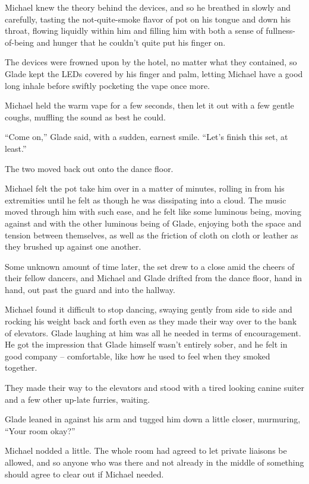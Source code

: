 \documentclass[12pt,letterpaper,oneside]{memoir}
\begin{document}
  Michael knew the theory behind the devices, and so he breathed in slowly and carefully, tasting the not-quite-smoke flavor of pot on his tongue and down his throat, flowing liquidly within him and filling him with both a sense of fullness-of-being and hunger that he couldn't quite put his finger on.

  The devices were frowned upon by the hotel, no matter what they contained, so Glade kept the LEDs covered by his finger and palm, letting Michael have a good long inhale before swiftly pocketing the vape once more.

  Michael held the warm vape for a few seconds, then let it out with a few gentle coughs, muffling the sound as best he could.

  ``Come on,'' Glade said, with a sudden, earnest smile.  ``Let's finish this set, at least.''

  The two moved back out onto the dance floor.

  Michael felt the pot take him over in a matter of minutes, rolling in from his extremities until he felt as though he was dissipating into a cloud.  The music moved through him with such ease, and he felt like some luminous being, moving against and with the other luminous being of Glade, enjoying both the space and tension between themselves, as well as the friction of cloth on cloth or leather as they brushed up against one another.

  Some unknown amount of time later, the set drew to a close amid the cheers of their fellow dancers, and Michael and Glade drifted from the dance floor, hand in hand, out past the guard and into the hallway.

  Michael found it difficult to stop dancing, swaying gently from side to side and rocking his weight back and forth even as they made their way over to the bank of elevators.  Glade laughing at him was all he needed in terms of encouragement.  He got the impression that Glade himself wasn't entirely sober, and he felt in good company -- comfortable, like how he used to feel when they smoked together.

  They made their way to the elevators and stood with a tired looking canine suiter and a few other up-late furries, waiting.

  Glade leaned in against his arm and tugged him down a little closer, murmuring, ``Your room okay?''

  Michael nodded a little.  The whole room had agreed to let private liaisons be allowed, and so anyone who was there and not already in the middle of something should agree to clear out if Michael needed.
\end{document}
